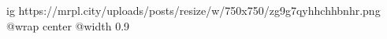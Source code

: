  
 
 
 
 

\ifcmt
  ig https://mrpl.city/uploads/posts/resize/w/750x750/zg9g7qyhhchhbnhr.png
  @wrap center
  @width 0.9
\fi
